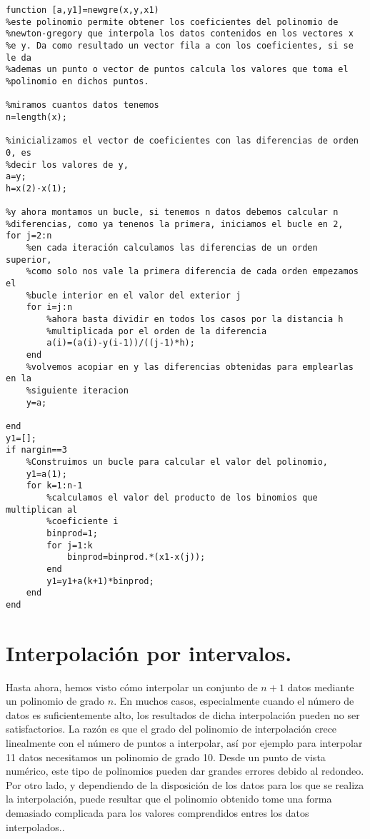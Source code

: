 \begin{verbatim}
function [a,y1]=newgre(x,y,x1)
%este polinomio permite obtener los coeficientes del polinomio de
%newton-gregory que interpola los datos contenidos en los vectores x
%e y. Da como resultado un vector fila a con los coeficientes, si se le da
%ademas un punto o vector de puntos calcula los valores que toma el
%polinomio en dichos puntos.

%miramos cuantos datos tenemos
n=length(x);

%inicializamos el vector de coeficientes con las diferencias de orden 0, es
%decir los valores de y,
a=y;
h=x(2)-x(1);

%y ahora montamos un bucle, si tenemos n datos debemos calcular n
%diferencias, como ya tenenos la primera, iniciamos el bucle en 2,
for j=2:n
    %en cada iteración calculamos las diferencias de un orden superior,
    %como solo nos vale la primera diferencia de cada orden empezamos el
    %bucle interior en el valor del exterior j
    for i=j:n
        %ahora basta dividir en todos los casos por la distancia h
        %multiplicada por el orden de la diferencia
        a(i)=(a(i)-y(i-1))/((j-1)*h);
    end
    %volvemos acopiar en y las diferencias obtenidas para emplearlas en la
    %siguiente iteracion
    y=a;
    
end
y1=[];
if nargin==3
    %Construimos un bucle para calcular el valor del polinomio,
    y1=a(1);
    for k=1:n-1
        %calculamos el valor del producto de los binomios que multiplican al
        %coeficiente i
        binprod=1;
        for j=1:k
            binprod=binprod.*(x1-x(j));
        end
        y1=y1+a(k+1)*binprod;
    end
end
\end{verbatim}

\section{Interpolación por intervalos.}

Hasta ahora, hemos visto cómo interpolar un conjunto de $n+1$ datos mediante un polinomio de grado $n$. En muchos casos, especialmente cuando el número de datos es suficientemente alto, los resultados de dicha interpolación pueden no ser satisfactorios.  La razón es que el grado del polinomio de interpolación crece linealmente con el número de puntos a interpolar, así por ejemplo para interpolar 11 datos necesitamos un polinomio de grado 10. Desde un punto de vista numérico, este tipo de polinomios pueden dar grandes errores debido al redondeo. Por otro lado, y dependiendo de la disposición de los datos para los que se realiza la interpolación, puede resultar que el polinomio obtenido tome una forma demasiado complicada para los valores comprendidos entres los datos interpolados..  

